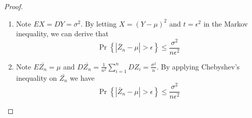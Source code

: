 \begin{exercise}
\begin{proof}
\begin{enumerate}
    \item {
      Note $EX = DY =\sigma^2$. By letting $X = (Y-\mu)^2$ and $t = \epsilon^2$ in the Markov inequality, we can derive that
    \begin{equation}\operatorname{Pr}\left\{\left|\bar{Z}_{n}-\mu\right|>\epsilon\right\} \leq \frac{\sigma^{2}}{n \epsilon^{2}}\end{equation}
    }
    \item {
      Note $E\bar{Z_n} = \mu$ and $D\bar{Z_n} = \frac{1}{n^2} \sum_{i=1}^n DZ_i = \frac{\sigma^2}{n}$. By applying Chebyshev's inequality on $\bar{Z_n}$ we have
    \begin{equation}\operatorname{Pr}\left\{\left|\bar{Z}_{n}-\mu\right|>\epsilon\right\} \leq \frac{\sigma^{2}}{n \epsilon^{2}}\end{equation}
    }
  \end{enumerate}
  \end{proof}
  \label{ex4-5}
\end{exercise}

